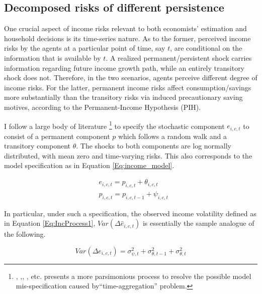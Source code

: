 \hypertarget{decomposed-risks-of-different-nature}{%
\subsection{Decomposed risks of different persistence}\label{dcomposed-risks-of-different-nature}}

One crucial aspect of income risks relevant to both economists' estimation and household decisions is its time-series nature. As to the former, perceived income risks by the agents at a particular point of time, say $t$, are conditional on the information that is available by $t$. A realized permanent/persistent shock carries information regarding future income growth path, while an entirely transitory shock does not. Therefore, in the two scenarios, agents perceive different degree of income risks. For the latter, permanent income risks affect consumption/savings more substantially than the transitory risks via induced precautionary saving motives, according to the Permanent-Income Hypothesis (PIH). 

I follow a large body of literature \footnote{\cite{abowd1989covariance}, \cite{gottschalk1994growth},\cite{carroll1997nature}, \cite{blundell_consumption_2008}, etc. \cite{crawley2022parsimonious} presents a more parsimonious process to resolve the possible model mis-specification caused by``time-aggregation'' problem.} to specify the stochastic component $e_{i,c,t}$ to consist of a permanent component $p$ which follows a random walk and a transitory component $\theta$. The shocks to both components are log normally distributed, with mean zero and time-varying risks. This also corresponds to the model specification as in Equation \ref{Eq:income_model}.

\begin{equation}
\begin{split}
\label{Eq:IncProcess}
& e_{i,c,t} = p_{i,c,t} + \theta_{i,c,t} \\
& p_{i,c,t} = p_{i,c,t-1}+\psi_{i,c,t} 
\end{split}
\end{equation}

In particular, under such a specification, the observed income volatility defined as in Equation \ref{Eq:IncProcess1}, $Var(\Delta \hat e_{i,c,t})$ is essentially the sample analogue of the following.

\begin{equation}
\label{Eq:income_volatility}
    Var(\Delta e_{i,c,t}) = \sigma^2_{\psi,t} + \sigma^2_{\theta,t-1} +\sigma^2_{\theta,t}
\end{equation}


